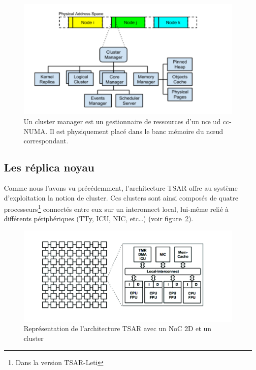       \begin{figure}[!h]
        \centering \includegraphics[scale=0.2]{include/img/cluster_manager}
        \caption{Un cluster manager est un gestionnaire de ressources d'un n\oe
          ud cc-NUMA. Il est physiquement placé dans le banc mémoire du n\oe ud
          correspondant.}
        \label{fig:cluster_manager}
      \end{figure}

      
    \subsection{Les réplica noyau}

      Comme nous l'avons vu précédemment, l'architecture TSAR offre au système
      d'exploitation la notion de cluster. Ces clusters sont ainsi composés de
      quatre processeurs\footnote{Dans la version TSAR-Leti} connectés entre eux
      sur un interonnect local, lui-même relié à différents périphériques (TTy,
      ICU, NIC, etc\ldots) (voir figure~\ref{fig:tsar_cluster}).
      
      \begin{figure}[!h]
        \centering \includegraphics[scale=0.3]{include/img/tsar_clusters.png}
        \caption{Représentation de l'architecture TSAR avec un NoC 2D et un
          cluster~\cite{almaless2014universite}}
        \label{fig:tsar_cluster}

      \end{figure}

